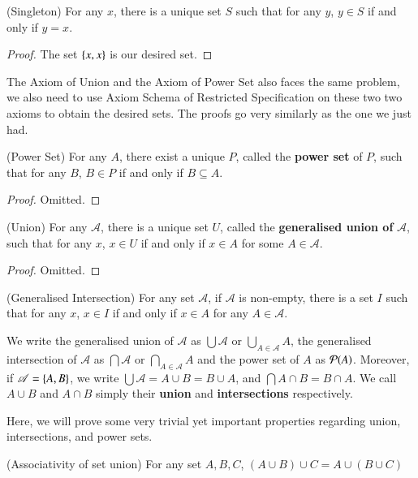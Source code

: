 \begin{prop}
    (Singleton) For any $x$, there is a unique set $S$ such that for any $y$, $y\in S$ if and only if $y= x$.
\end{prop}
\begin{proof}
    The set $\{x,x\}$ is our desired set.
\end{proof}
The Axiom of Union and the Axiom of Power Set also faces the same problem, we also need to use Axiom Schema of Restricted Specification on these two two axioms to obtain the desired sets. The proofs go very similarly as the one we just had. 
\begin{prop}
    (Power Set) For any $A$, there exist a unique $P$, called the \textbf{power set} of $P$, such that for any $B$, $B\in P$ if and only if $B\subseteq A$.
\end{prop}
\begin{proof}
    Omitted.
\end{proof}
\begin{prop}
    (Union) For any $\mathscr A$, there is a unique set $U$, called the \textbf{generalised union of }$\mathscr A$, such that for any $x$, $x\in U$ if and only if $x\in A$ for some $A\in \mathscr A$.
\end{prop}
\begin{proof}
    Omitted.
\end{proof}
\begin{prop}
    (Generalised Intersection) For any set $\mathscr A$, if $\mathscr A$ is non-empty, there is a set $I$ such that for any $x$, $x\in I$ if and only if $x\in A$ for any $A\in\mathscr A$. 
\end{prop}
\begin{rem}
    We write the generalised union of $\mathscr A$ as $\bigcup\mathscr A$ or $\displaystyle \bigcup_{A\in\mathscr A}A$, the generalised intersection of $\mathscr A$ as $\bigcap \mathscr A$ or $\displaystyle\bigcap_{A\in\mathscr A}A$ and the power set of $A$ as $\mathcal{P}(A)$. Moreover, if $\mathscr A= \{A,B\}$, we write $\bigcup \mathscr A = A\cup B = B\cup A$, and $\bigcap A\cap B = B\cap A$. We call $A\cup B$ and $A\cap B$ simply their \textbf{union} and \textbf{intersections} respectively.
\end{rem}
Here, we will prove some very trivial yet important properties regarding union, intersections, and power sets.
\begin{prop}
    {(Associativity of set union) For any set $A,B,C$, $(A\cup B)\cup C = A\cup(B\cup C)$}
\end{prop}
